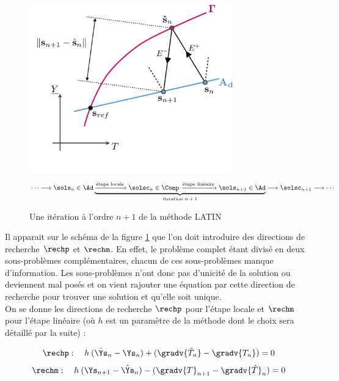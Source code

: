 \begin{figure}[!htb]
\centering
\includegraphics[width=8.8cm]{LATIN.figure/latin_iter_n1}
\begin{equation}
   \cdots\longrightarrow
   \sols_{n}\in\Ad
   \underbrace{
   \xrightarrow{\text{étape locale}}
   \solsc_{n}\in\Comp
   \xrightarrow{\text{étape linéaire}}
   \sols_{n+1}\in\Ad
   }_\text{iteration $n+1$}
   \longrightarrow
   \solsc_{n+1}
   \longrightarrow\cdots
\end{equation}
\caption{Une itération à l'ordre $n+1$ de la méthode LATIN\label{Latin_schema}}
\end{figure}


Il apparait sur le schéma de la figure \ref{Latin_schema} que l'on doit introduire des \og  directions de recherche\fg{} $\rechp$ et $\rechm$. En effet, le problème complet étant divisé en deux sous-problèmes complémentaires, chacun de ces sous-problèmes manque d'information. Les sous-problèmes n'ont donc pas d'unicité de la solution ou deviennent mal posés et on vient rajouter une équation par cette direction de recherche pour trouver une solution et qu'elle soit unique.\\
 On se donne les directions de recherche $\rechp$ pour l'étape locale et $\rechm$ pour l'étape linéaire (où $h$ est un paramètre de la méthode dont le choix sera détaillé par la suite) :

\begin{equation}\label{dir_rech+}
\rechp:  \quad h\: (\hat{\Ys}_n-\Ys_n)+ (\gradv{\hat{T}_n}-\gradv{T_n}) = 0
\end{equation}
\begin{equation}\label{dir_rech-}
\rechm :  \quad h\: (\Ys_{n+1}-\hat{\Ys}_n)- (\gradv{T}_{n+1}-\gradv{\hat{T}}_n) = 0
\end{equation}\\


